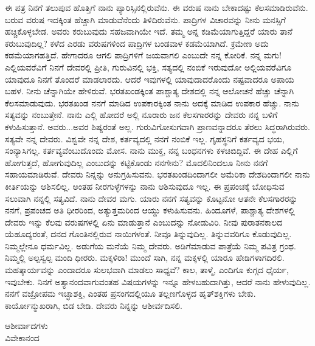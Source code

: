 ಈ ಪತ್ರ ನಿನಗೆ ತಲುಪುವ ಹೊತ್ತಿಗೆ ನಾನು ಪ್ಯಾರಿಸ್ಸಿನಲ್ಲಿರುವೆನು. ಈ ವರುಷ ನಾನು ಬೇಕಾದಷ್ಟು ಕೆಲಸಮಾಡಿರುವೆನು. ಬರುವ ವರುಷ ಇದಕ್ಕಿಂತ ಹೆಚ್ಚಾಗಿ ಮಾಡುವೆನೆಂದು ತಿಳಿದಿರುವೆನು. ಪಾದ್ರಿಗಳ ವಿಚಾರವನ್ನು ನೀನು ಮನಸ್ಸಿಗೆ ಹಚ್ಚಿಕೊಳ್ಳಬೇಡ. ಅವರು ಕರುಬುವುದು ಸಹಜವಾಗಿಯೇ ಇದೆ. ತಮ್ಮ ಅನ್ನ ಕಡಿಮೆಯಾಗುತ್ತಿದ್ದರೆ ಯಾರು ತಾನೆ ಕರುಬುವುದಿಲ್ಲ? ಕಳೆದ ಎರಡು ವರುಷಗಳಿಂದ ಪಾದ್ರಿಗಳ ಬಂಡವಾಳ ಕಡಮೆಯಾಗಿದೆ. ಕ್ರಮೇಣ ಅದು ಕಡಮೆಯಾಗಹತ್ತಿದೆ. ಹೇಗಾದರೂ ಆಗಲಿ ಪಾದ್ರಿಗಳಿಗೆ ಜಯವಾಗಲಿ ಎಂಬುದೇ ನನ್ನ ಕೋರಿಕೆ. ನನ್ನ ಮಗು! ಎಲ್ಲಿಯವರೆವಿಗೆ ನಿನಗೆ ದೇವರಲ್ಲಿ ಪ್ರೀತಿ, ಗುರುವಿನಲ್ಲಿ ಭಕ್ತಿ, ಸತ್ಯದಲ್ಲಿ ನಂಬಿಕೆ ಇರುವುದೋ ಅಲ್ಲಿಯವರೆವಿಗೂ ಯಾವುದೂ ನಿನಗೆ ತೊಂದರೆ ಮಾಡಲಾರದು. ಆದರೆ ಇವುಗಳಲ್ಲಿ ಯಾವುದಾದರೊಂದು ನಷ್ಟವಾದರೂ ಅಪಾಯ ಬಹಳ. ನೀನು ಚೆನ್ನಾಗಿಯೇ ಹೇಳಿರುವೆ. ಭರತಖಂಡಕ್ಕಿಂತ ಪಾಶ್ಚಾತ್ಯ ದೇಶದಲ್ಲಿ ನನ್ನ ಆಲೋಚನೆ ಹೆಚ್ಚು ಚೆನ್ನಾಗಿ ಕೆಲಸಮಾಡುವುದು. ಭರತಖಂಡ ನನಗೆ ಮಾಡಿದ ಉಪಕಾರಕ್ಕಿಂತ ನಾನು ಅದಕ್ಕೆ ಮಾಡಿದ ಉಪಕಾರ ಹೆಚ್ಚು. ನಾನು ಸತ್ಯವನ್ನು ನಂಬುತ್ತೇನೆ. ನಾನು ಎಲ್ಲಿ ಹೋದರೆ ಅಲ್ಲಿ ನೂರಾರು ಜನ ಕೆಲಸಗಾರರನ್ನು ದೇವರು ನನ್ನ ಬಳಿಗೆ ಕಳುಹಿಸುತ್ತಾನೆ. ಅವರು...ಅವರ ಶಿಷ್ಯರಂತೆ ಅಲ್ಲ. ಗುರುವಿಗೋಸುಗವಾಗಿ ಪ್ರಾಣವನ್ನಾದರೂ ತೆರಲು ಸಿದ್ಧರಾಗಿರುವರು. ಸತ್ಯವೇ ನನ್ನ ದೇವರು. ವಿಶ್ವವೇ ನನ್ನ ದೇಶ, ಕರ್ತವ್ಯದಲ್ಲಿ ನನಗೆ ನಂಬಿಕೆ ಇಲ್ಲ. ಗೃಹಸ್ಥನಿಗೆ ಕರ್ತವ್ಯದ ಭಯ, ಸಂನ್ಯಾಸಿಗಲ್ಲ. ಕರ್ತವ್ಯವೆಂಬುದೊಂದು ಮೋಸ. ನಾನು ಮುಕ್ತ, ನನ್ನ ಬಂಧನಗಳು ಕಳಚಿಬಿದ್ದಿವೆ. ಈ ದೇಹ ಎಲ್ಲಿಗೆ ಹೋಗುತ್ತದೆ, ಹೋಗುವುದಿಲ್ಲ\enginline{-} ಎಂಬುದನ್ನು ಕಟ್ಟಿಕೊಂಡು ನನಗೇನು? ಮೊದಲಿನಿಂದಲೂ ನೀನು ನನಗೆ ಸಹಾಯಮಾಡಿರುವೆ. ದೇವರು ನಿನ್ನನ್ನು ಅನುಗ್ರಹಿಸುವನು. ಭರತಖಂಡದಿಂದಾಗಲೀ ಅಮೆರಿಕಾ ದೇಶದಿಂದಾಗಲೀ ನಾನು ಕೀರ್ತಿಯನ್ನು ಆಶಿಸಲಿಲ್ಲ. ಅಂತಹ ನೀರಗುಳ್ಳೆಗಳನ್ನು ನಾನು ಆಶಿಸುವುದೂ ಇಲ್ಲ. ಈ ಪ್ರಪಂಚಕ್ಕೆ ಬೋಧಿಸುವ ಸಲುವಾಗಿ ನನ್ನಲ್ಲಿ ಸತ್ಯವಿದೆ. ನಾನು ದೇವರ ಮಗು. ಯಾರು ನನಗೆ ಸತ್ಯವನ್ನು ಕೊಟ್ಟನೋ ಆತನೇ ಕೆಲಸಗಾರರನ್ನು ನನಗೆ, ಪ್ರಪಂಚದ ಅತಿ ಧೀರರಿಂದ, ಅತ್ಯುತ್ತಮರಿಂದ ಆಯ್ದು ಕಳುಹಿಸುವನು. ಹಿಂದೂಗಳೆ, ಪಾಶ್ಚಾತ್ಯ ದೇಶಗಳಲ್ಲಿ ದೇವರು ಇನ್ನು ಕೆಲವು ವರುಷಗಳಲ್ಲಿ ಏನು ಮಾಡುತ್ತಾನೆ ಎಂಬುದನ್ನು ನೋಡುವಿರಿ. ನೀವು ಪುರಾತನಕಾಲದ ಯೆಹೂದ್ಯರಂತೆ, ದನದ ಗೊಂತಿನಲ್ಲಿರುವ ನಾಯಿಗಳಂತೆ. ನೀವೂ ತಿನ್ನುವುದಿಲ್ಲ. ತಿನ್ನುವವರಿಗೂ ಕೊಡುವುದಿಲ್ಲ. ನಿಮ್ಮಲ್ಲೇನೂ ಧರ್ಮವಿಲ್ಲ. ಅಡುಗೆಯ ಮನೆಯೆ ನಿಮ್ಮ ದೇವರು. ಅಡಿಗೆಮಾಡುವ ಪಾತ್ರೆಯೆ ನಿಮ್ಮ ಪವಿತ್ರ ಗ್ರಂಥ. ನಿಮ್ಮಲ್ಲಿ ಅಲ್ಪಸ್ವಲ್ಪ ಮಂದಿ ಧೀರರು. ಮಕ್ಕಳಿರಾ! ಮುಂದೆ ಸಾಗಿ, ನನ್ನ ಮಕ್ಕಳಲ್ಲಿ ಯಾರೂ ಹೇಡಿಗಳಾಗದಿರಲಿ. ಮಹತ್ಕಾರ್ಯವನ್ನು ಎಂದಾದರೂ ಸುಲಭವಾಗಿ ಮಾಡಲು ಸಾಧ್ಯವೆ? ಕಾಲ, ತಾಳ್ಮೆ, ಎಂದಿಗೂ ಕುಗ್ಗದ ಧೈರ್ಯ, ಇವುಬೇಕು. ನಿನಗೆ ಅತ್ಯಾನಂದವಾಗುವಂತಹ ವಿಷಯಗಳನ್ನು ಇನ್ನೂ ಹೇಳಬಹುದಾಗಿತ್ತು, ಆದರೆ ನಾನು ಹೇಳುವುದಿಲ್ಲ. ನನಗೆ ವಜ್ರೋಪಮ ಇಚ್ಛಾಶಕ್ತಿ, ಎಂತಹ ಪ್ರಸಂಗದಲ್ಲಿಯೂ ತಲ್ಲಣಗೊಳ್ಳದ ಹೃತ್‌ಶಕ್ತಿಗಳು ಬೇಕು. ಕಾರ್ಯೋನ್ಮುಖರಾಗಿ, ಬಿಡ ಬೇಡಿ. ದೇವರು ನಿನ್ನನ್ನು ಆಶೀರ್ವದಿಸಲಿ.

\vspace{-0.4cm}

{\flushright
ಆಶೀರ್ವಾದಗಳು\\ವಿವೇಕಾನಂದ\par}

\vspace{-0.3cm}

